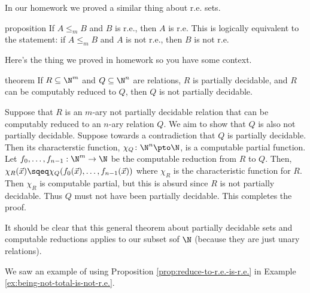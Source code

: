 \documentclass[class=article, crop=false]{standalone}
\begin{document}
In our homework we proved a similar thing about r.e. sets.
\begin{result}{proposition}{\label{prop:reduce-to-r.e.-is-r.e.}}
  If $A \leq_m B$ and $B$ is r.e., then $A$ is r.e. This is logically equivalent to the statement: if $A\leq_m B$ and $A$ is not r.e., then $B$ is not r.e.
\end{result}

Here's the thing we proved in homework so you have some context.
\begin{result}{theorem}
  If $R \subseteq \N^m$ and $Q \subseteq \N^n$ are relations, $R$ is partially decidable, and $R$ can be computably reduced to $Q$, then $Q$ is not partially decidable.
\end{result}
\begin{pf}
  Suppose that $R$ is an $m$-ary not partially decidable relation that can be computably reduced to an $n$-ary relation $Q$. We aim to show that $Q$ is also not partially decidable. Suppose towards a contradiction that $Q$ is partially decidable. Then its characterstic function, $\chi_Q \colon \N^n \pto \N$, is a computable partial function. Let $f_0, \ldots, f_{n-1} : \N^m \to \N$ be the computable reduction from $R$ to $Q$. Then, $\chi_R(\vec x) \sqeq \chi_Q(f_0(\vec x), \ldots, f_{n-1}(\vec x))$ where $\chi_R$ is the characteristic function for $R$. Then $\chi_R$ is computable partial, but this is absurd since $R$ is not partially decidable. Thus $Q$ must not have been partially decidable. This completes the proof.
\end{pf}

It should be clear that this general theorem about partially decidable sets and computable reductions applies to our subset sof $\N$ (because they are just unary relations).

We saw an example of using Proposition \ref{prop:reduce-to-r.e.-is-r.e.} in Example \ref{ex:being-not-total-is-not-r.e.}.
\end{document}
